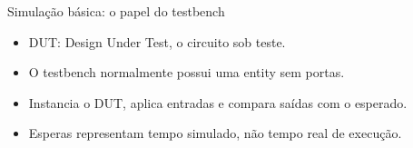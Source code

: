\begin{frame}[t]{Simulação básica: o papel do testbench}
\begin{center}\end{center}\begin{itemize}
\item DUT: Design Under Test, o circuito sob teste.
\item O testbench normalmente possui uma entity sem portas.
\item Instancia o DUT, aplica entradas e compara saídas com o esperado.
\item Esperas representam tempo simulado, não tempo real de execução.
\end{itemize}
\end{frame}
